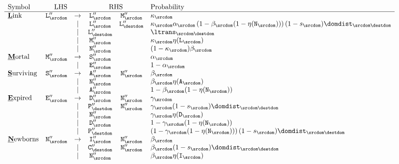 \[
\begin{array}{lrcccl}
\mbox{Symbol} & \mbox{LHS} & & \multicolumn{2}{c}{\mbox{RHS}} & \mbox{Probability} \\
\hline
\mbox{\underline{\bf L}ink} &
\ntlinks''_\srcdom & \to & \ntlinks''_\srcdom & \ntmor''_\srcdom & \kappa_\srcdom \\
& & | & \ntlinks''_\srcdom & \ntlinks''_\destdom & \kappa_\srcdom \alpha_\srcdom \left( 1 - \beta_\srcdom(1 - \nullability(\ntnew_\srcdom)) \right) (1 - \tok_\srcdom) \domdist_{\srcdom\destdom} \\
& & | & \ntlinks''_\destdom & & \ltrans_{\srcdom\destdom} \\
& & | & \ntmor''_\srcdom & & \kappa_\srcdom \nullability(\ntlinks_\srcdom) \\
& & | & \ntnew''_\srcdom & & (1 - \kappa_\srcdom) \beta_\srcdom \\
\mbox{\underline{\bf M}ortal} &
\ntmor''_\srcdom & \to & \ntsur''_\srcdom & & \alpha_\srcdom \\
& & | & \ntexp''_\srcdom & & 1 - \alpha_\srcdom \\
\mbox{\underline{\bf S}urviving} &
\ntsur''_\srcdom & \to & \ntaln''_\srcdom & \ntnew''_\srcdom & \beta_\srcdom \\
& & | & \ntnew''_\srcdom & & \beta_\srcdom \nullability(\ntaln_\srcdom) \\
& & | & \ntaln''_\srcdom & & 1 - \beta_\srcdom(1 - \nullability(\ntnew_\srcdom)) \\
\mbox{\underline{\bf E}xpired} & \ntexp''_\srcdom & \to & \ntdel''_\srcdom & \ntnew''_\srcdom & \gamma_\srcdom \\
& & | & \ntparent''_\destdom & \ntnew''_\srcdom & \gamma_\srcdom (1 - \tok_\srcdom) \domdist_{\srcdom\destdom} \\
& & | & \ntnew''_\srcdom & & \gamma_\srcdom \nullability(\ntdel_\srcdom) \\
& & | & \ntdel''_\srcdom & & 1 - \gamma_\srcdom(1 - \nullability(\ntnew_\srcdom)) \\
& & | & \ntparent''_\destdom & & \left( 1 - \gamma_\srcdom(1 - \nullability(\ntnew_\srcdom)) \right) (1 - \tok_\srcdom) \domdist_{\srcdom\destdom} \\
\mbox{\underline{\bf N}ewborns} & \ntnew''_\srcdom & \to & \ntins''_\srcdom & \ntnew''_\srcdom & \beta_\srcdom \\
& & | & \ntchild''_\destdom & \ntnew''_\srcdom & \beta_\srcdom (1 - \tok_\srcdom) \domdist_{\srcdom\destdom} \\
& & | & \ntnew''_\srcdom & & \beta_\srcdom \nullability(\ntins_\srcdom) \\

\end{array}\]
